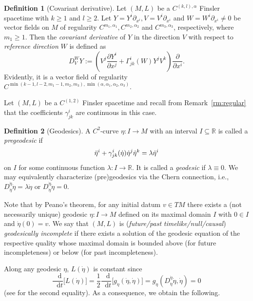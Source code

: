 \documentclass[a4paper,11pt]{article}
\numberwithin{equation}{section}
\theoremstyle{definition}
\newtheorem{Definition}{Definition}[section]
\theoremstyle{plain}
\newcommand{\R}{\mathbb R}
\newcommand*\diff{\mathop{}\!\mathrm{d}}
\begin{document}
\begin{Definition}[Covariant derivative]
Let $(M,L)$ be a $C^{(k,l),\alpha}$ Finsler spacetime with $k \geq 1$ and $l \geq 2$.
Let $Y = Y^i \partial_{x^i},V = V^i\partial_{x^i}$ and $W = W^i \partial_{x^i} \neq 0$ be vector fields on $M$ of regularity $C^{m_1,\alpha_1}, C^{m_2,\alpha_2}$ and $C^{m_3,\alpha_3}$, respectively, where $m_1 \geq 1$.
Then the \emph{covariant derivative} of $Y$ in the direction $V$ with respect to \emph{reference direction} $W$ is defined as
\begin{equation*}
    D^W_V Y := \left( V^j \frac{\partial Y^i}{\partial x^j} + \Gamma^i_{jk}(W) Y^j V^k\right) \frac{\partial}{\partial x^i}.
\end{equation*}
Evidently, it is a vector field of regularity $C^{\min(k-1,l-2, m_1-1, m_2,m_3),\min(\alpha,\alpha_1,\alpha_2,\alpha_3)}$.
\end{Definition}


Let $(M,L)$ be a $C^{(1,2)}$ Finsler spacetime and recall from Remark~\ref{rm:regular} that the coefficients $\gamma^i_{jk}$ are continuous in this case.

\begin{Definition}[Geodesics]
A $C^2$-curve $\eta:I \to M$ with an interval $I \subseteq \R$ is called a \emph{pregeodesic} if
\begin{equation*}
\Ddot{\eta}^i + \gamma^i_{jk}(\dot{\eta})\dot \eta^j \dot \eta^k = \lambda \dot{\eta}^i
\end{equation*}
on $I$ for some continuous function $\lambda:I \to \R$. It is called a \emph{geodesic} if $\lambda \equiv 0$. 
We may equivalently characterize (pre)geodesics via the Chern connection, i.e., $D^{\dot{\eta}}_{\dot{\eta}}\dot{\eta} =\lambda \dot{\eta}$ or $D^{\dot{\eta}}_{\dot{\eta}}\dot{\eta} = 0$.
\end{Definition}

Note that by Peano's theorem, for any initial datum $v \in TM$ there exists a (not necessarily unique) geodesic $\eta:I \to M$ defined on its maximal domain $I$ with $0 \in I$ and $\dot{\eta}(0) = v$. 
We say that $(M,L)$ is (\emph{future/past} \emph{timelike/null/causal}) \emph{geodesically incomplete} if there exists a solution of the geodesic equation of the respective quality whose maximal domain is bounded above (for future incompleteness) or below (for past incompleteness).

Along any geodesic $\eta$, $L(\dot{\eta})$ is constant since
\[
\frac{\diff}{\diff t}\bigl[ L(\dot{\eta}) \bigr]
= \frac{1}{2} \frac{\diff}{\diff t}\bigl[ g_{\dot{\eta}}(\dot{\eta},\dot{\eta}) \bigr]
=g_{\dot{\eta}}(D^{\dot{\eta}}_{\dot{\eta}}\dot{\eta},\dot{\eta})
=0
\]
(see \cite[Eq.\ (3.1)]{LuMinguzziOhtaSingularity} for the second equality).
As a consequence, we obtain the following.
\end{document}
